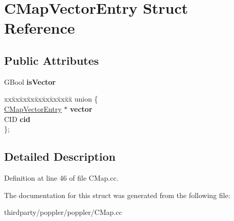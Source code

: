 \hypertarget{struct_c_map_vector_entry}{}\section{C\+Map\+Vector\+Entry Struct Reference}
\label{struct_c_map_vector_entry}
\subsection*{Public Attributes}
\begin{DoxyCompactItemize}
\item 
\mbox{\label{struct_c_map_vector_entry_a497d84bfccc6feed92fcbd3ebf19e8e4}} 
G\+Bool {\bfseries is\+Vector}
\item 
\mbox{\label{struct_c_map_vector_entry_aa12503222414653f537668f565db6006}} 
\begin{tabbing}
xx\=xx\=xx\=xx\=xx\=xx\=xx\=xx\=xx\=\kill
union \{\\
\>\hyperlink{struct_c_map_vector_entry}{CMapVectorEntry} $\ast$ {\bfseries vector}\\
\>CID {\bfseries cid}\\
\}; \\

\end{tabbing}\end{DoxyCompactItemize}


\subsection{Detailed Description}


Definition at line 46 of file C\+Map.\+cc.



The documentation for this struct was generated from the following file\+:\begin{DoxyCompactItemize}
\item 
thirdparty/poppler/poppler/C\+Map.\+cc\end{DoxyCompactItemize}
